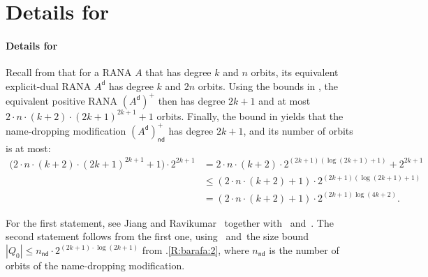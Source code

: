 \documentclass[10pt,a4paper]{amsart}
\theoremstyle{definition}
\newcommand{\op}[1]{\operatorname{\mathsf{#1}}}
\newcommand{\nd}{\op{nd}}
\newcommand{\dual}[1]{{#1}^\mathsf{d}}
\begin{document}
\section{Details for }

\paragraph*{Details for~}

Recall from  that for a RANA $A$ that has degree $k$ and $n$ orbits, its equivalent explicit-dual RANA $\dual{A}$ has degree $k$ and $2n$ orbits.
Using the bounds in , the equivalent positive RANA $(\dual{A})^+$ then has degree $2k+1$ and at most $2 \cdot n\cdot (k+2) \cdot (2k+1)^{2k+1} + 1$ orbits.
Finally, the bound in  yields that the name-dropping modification $(\dual{A})^+_{\nd}$ has degree $2k+1$, and its number of orbits is at most:
\begin{align*}
  \big(2\cdot n\cdot (k+2) \cdot (2k+1)^{2k+1} + 1\big)\cdot 2^{2k+1}
  &=
  2\cdot n\cdot (k+2) \cdot 2^{(2k+1) (\log(2k+1) +1)} + 2^{2k+1}
  \\
  &\leqslant
  (2\cdot n\cdot (k+2) + 1)\cdot 2^{(2k+1) (\log(2k+1) + 1)}
  \\
  &=
  (2\cdot n\cdot (k+2) + 1)\cdot 2^{(2k+1) \log(4k+2)}.
\end{align*}

\begin{IEEEproof}
  For the first statement, see Jiang and Ravikumar~\cite[Thm.~3.1]{jr91} together with~ and~.
  The second statement follows from the first one, using~ and~the size bound $|Q_0| \leqslant n_{\nd} \cdot 2^{(2k + 1) \cdot \log(2k + 1)}$ from .\ref{R:barafa:2}, where $n_{\nd}$ is the number of orbits of the name-dropping modification.%
\end{IEEEproof}
\end{document}
